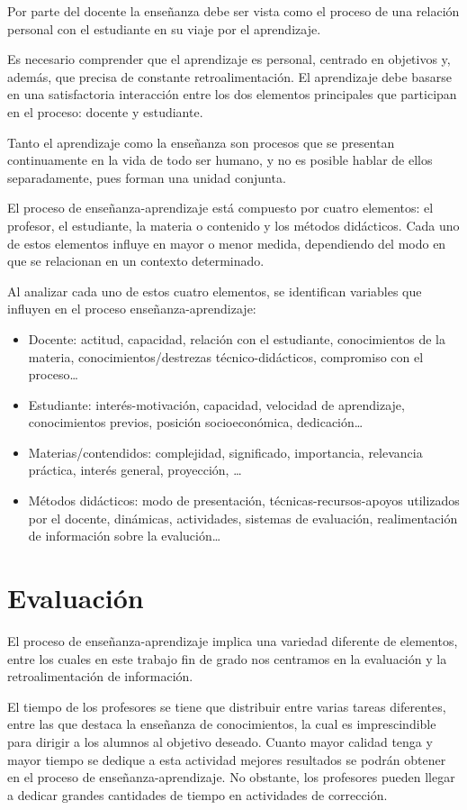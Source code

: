 Por parte del docente la enseñanza debe ser vista como el proceso de una relación personal con el estudiante en su viaje por el aprendizaje.

Es necesario comprender que el aprendizaje es personal, centrado en objetivos y, además, que precisa de constante retroalimentación. El aprendizaje debe basarse en una satisfactoria interacción entre los dos elementos principales que participan en el proceso: docente y estudiante.

Tanto el aprendizaje como la enseñanza son procesos que se presentan continuamente en la vida de todo ser humano, y no es posible hablar de ellos separadamente, pues forman una unidad conjunta.

El proceso de enseñanza-aprendizaje está compuesto por cuatro elementos: el profesor, el estudiante, la materia o contenido y los métodos didácticos. Cada uno de estos elementos influye en mayor o menor medida, dependiendo del modo en que se relacionan en un contexto determinado.

Al analizar cada uno de estos cuatro elementos, se identifican variables que influyen en el proceso enseñanza-aprendizaje:

\begin{itemize}
\item Docente: actitud, capacidad, relación con el estudiante, conocimientos de la materia, conocimientos/destrezas técnico-didácticos,  compromiso con el proceso…
\item Estudiante:  interés-motivación, capacidad, velocidad de aprendizaje, conocimientos previos, posición socioeconómica, dedicación…  
\item Materias/contendidos: complejidad, significado, importancia, relevancia práctica, interés general, proyección, …
\item Métodos didácticos: modo de presentación, técnicas-recursos-apoyos utilizados por el docente, dinámicas, actividades, sistemas de evaluación, realimentación de información sobre la evalución… 
\end{itemize}

\section{Evaluación}
El proceso de enseñanza-aprendizaje implica una variedad diferente de elementos, entre los cuales en este trabajo fin de grado nos centramos en la evaluación y la retroalimentación de información.

El tiempo de los profesores se tiene que distribuir entre varias tareas diferentes, entre las que destaca la enseñanza de conocimientos, la cual es imprescindible para dirigir a los alumnos al objetivo deseado. Cuanto mayor calidad tenga y mayor tiempo se dedique a esta actividad mejores resultados se podrán obtener en el proceso de enseñanza-aprendizaje. No obstante, los profesores pueden llegar a dedicar grandes cantidades de tiempo en actividades de corrección.

